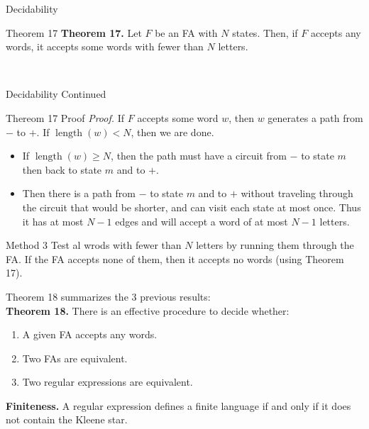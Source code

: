 \documentclass{article}
\DeclareMathOperator{\length}{length}
\begin{document}
\begin{multicols*}{3}
\begin{blackbox}{Decidability}
    \begin{bluebox}{Theorem 17}
        \textbf{Theorem 17.} Let $F$ be an FA with $N$ states. Then, if $F$ accepts any words, it accepts some words with fewer than $N$ letters.
    \end{bluebox}\\[-2ex]
\end{blackbox}
\begin{blackbox}{Decidability Continued}
    \begin{bluebox}{Thereom 17 Proof}
        \textit{Proof.} If $F$ accepts some word $w$, then $w$ generates a path from $-$ to $+$. If $\length(w) < N$, then we are done. 
        \begin{itemize}[leftmargin=5pt]
            \item If $\length(w) \geq N$, then the path must have a circuit from $-$ to state $m$ then back to state $m$ and to $+$.
            \item Then there is a path from $-$ to state $m$ and to $+$ without traveling through the circuit that would be shorter, and can visit each state at most once. Thus it has at most $N-1$ edges and will accept a word of at most $N-1$ letters.
        \end{itemize}
    \end{bluebox}
    \begin{brownbox}{Method 3}
        Test al wrods with fewer than $N$ letters by running them through the FA. If the FA accepts none of them, then it accepts no words (using Theorem 17).        
    \end{brownbox}
    Theorem 18 summarizes the 3 previous results: \\[1ex]
    \textbf{Theorem 18.} There is an effective procedure to decide whether:
    \begin{enumerate}[leftmargin=15pt]
        \item A given FA accepts any words.
        \item Two FAs are equivalent.
        \item Two regular expressions are equivalent.
    \end{enumerate}

    \textbf{Finiteness.} A regular expression defines a finite language if and only if it does not contain the Kleene star. 
    

\end{blackbox}
\end{multicols*}
\end{document}
